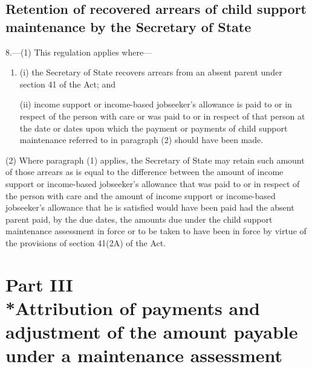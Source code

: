 \documentclass[12pt,a4paper]{article}
\begin{document}
\subsection[8. Retention of recovered arrears of child support maintenance by the Secretary of State]{\sloppy Retention of recovered arrears of child support maintenance by the Secretary of State}

8.—(1) This regulation applies where—
\begin{enumerate}\item[]
(i) the Secretary of State recovers arrears from an absent parent under section 41 of the Act; and

(ii) income support
or income-based jobseeker’s allowance  %
is paid to or in respect of the person with care or was paid to or in respect of that person at the date or dates upon which the payment or payments of child support maintenance referred to in paragraph (2) should have been made.
\end{enumerate}

(2) Where paragraph (1) applies, the Secretary of State may retain such amount of those arrears as is equal to the difference between the amount of income support 
or income-based jobseeker’s allowance  %
that was paid to or in respect of the person with care and the amount of income support 
or income-based jobseeker’s allowance  %
that he is satisfied would have been paid had the absent parent paid, by the due dates, the amounts due under the child support maintenance assessment in force or to be taken to have been in force by virtue of the provisions of section 41(2A) of the Act.


\section[Part III --- Attribution of payments and adjustment of the amount payable under a maintenance assessment]{\sloppy Part III\\*Attribution of payments and adjustment of the amount payable under a maintenance assessment}
\end{document}
